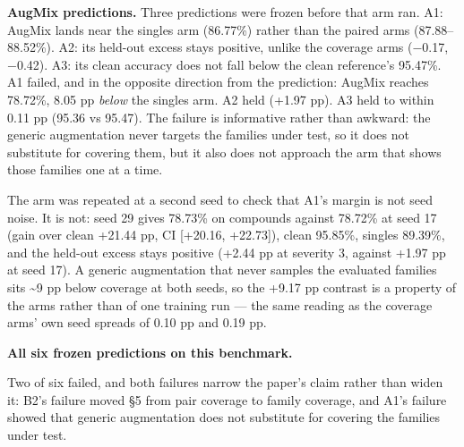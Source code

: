 \textbf{AugMix predictions.} Three predictions were frozen before that arm ran. A1: AugMix lands near the singles arm (86.77\%) rather than the paired arms (87.88--88.52\%). A2: its held-out excess stays positive, unlike the coverage arms ($-$0.17, $-$0.42). A3: its clean accuracy does not fall below the clean reference's 95.47\%. A1 failed, and in the opposite direction from the prediction: AugMix reaches 78.72\%, 8.05 pp \emph{below} the singles arm. A2 held (+1.97 pp). A3 held to within 0.11 pp (95.36 vs 95.47). The failure is informative rather than awkward: the generic augmentation never targets the families under test, so it does not substitute for covering them, but it also does not approach the arm that shows those families one at a time.

The arm was repeated at a second seed to check that A1's margin is not seed noise. It is not: seed 29 gives 78.73\% on compounds against 78.72\% at seed 17 (gain over clean +21.44 pp, CI [+20.16, +22.73]), clean 95.85\%, singles 89.39\%, and the held-out excess stays positive (+2.44 pp at severity 3, against +1.97 pp at seed 17). A generic augmentation that never samples the evaluated families sits \textasciitilde{}9 pp below coverage at both seeds, so the +9.17 pp contrast is a property of the arms rather than of one training run --- the same reading as the coverage arms' own seed spreads of 0.10 pp and 0.19 pp.

\textbf{All six frozen predictions on this benchmark.}

\noindent{}
Two of six failed, and both failures narrow the paper's claim rather than widen it: B2's failure moved §5 from pair coverage to family coverage, and A1's failure showed that generic augmentation does not substitute for covering the families under test.

